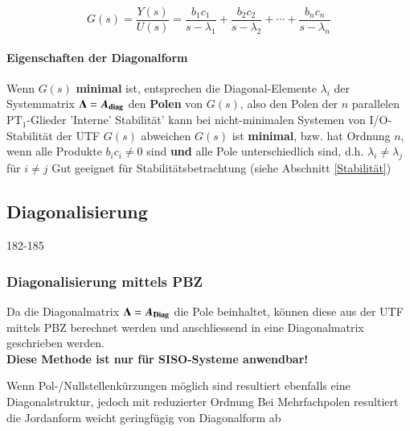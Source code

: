 $$ G(s) = \frac{Y(s)}{U(s)} = \frac{b_1 c_1}{s - \lambda_1} +  \frac{b_2 c_2}{s - \lambda_2} + \cdots + \frac{b_n c_n}{s - \lambda_n} $$


\paragraph{Eigenschaften der Diagonalform}

\begin{outline}
    \1 Wenn $G(s)$ \textbf{minimal} ist, entsprechen die Diagonal-Elemente $\lambda_i$ der Systemmatrix $\bm{\Lambda} = \bm{A_{\rm diag}}$ den \textbf{Polen} von $G(s)$, also den Polen der $n$ parallelen $\text{PT}_1$-Glieder
        \2 'Interne' Stabilität' kann bei nicht-minimalen Systemen von I/O-Stabilität der UTF $G(s)$ abweichen
     \1 $G(s)$ ist \textbf{minimal}, bzw. hat Ordnung $n$, wenn
        \2 alle Produkte $b_i c_i \neq 0$ sind \textbf{und}
        \2 alle Pole unterschiedlich sind, d.h. $\lambda_i \neq \lambda_j$ für $i \neq j$
    \1 Gut geeignet für Stabilitätsbetrachtung (siehe Abschnitt \ref{Stabilität})
\end{outline}



\subsection{Diagonalisierung}{182-185}
\label{Diagonalisierung}

\subsubsection{Diagonalisierung mittels PBZ}

Da die Diagonalmatrix $\bm{\Lambda} = \bm{A_{\rm Diag}}$ die Pole beinhaltet, können diese aus der UTF mittels PBZ berechnet werden und
anschliessend in eine Diagonalmatrix geschrieben werden. \\
\textbf{Diese Methode ist nur für SISO-Systeme anwendbar!}

\smallskip

\begin{outline}
    \1 Wenn Pol-/Nullstellenkürzungen möglich sind resultiert ebenfalls eine Diagonalstruktur, jedoch mit reduzierter Ordnung
    \1 Bei Mehrfachpolen resultiert die Jordanform
        \2 weicht geringfügig von Diagonalform ab
\end{outline}



